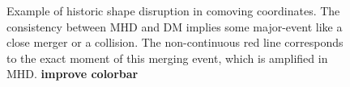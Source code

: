 \begin{figure}[!ht]
  \centering
  \hfill
  \caption{Example of historic shape disruption in comoving coordinates. The consistency between MHD and DM implies some major-event like a close merger or a collision. The non-continuous red line corresponds to the exact moment of this merging event, which is amplified in MHD.  \textbf{improve colorbar}}
\end{figure}

